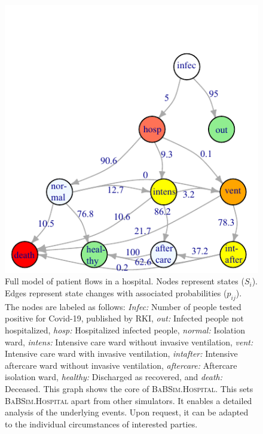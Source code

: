 \documentclass[conference]{IEEEtran}
\newcommand{\babsimhospital}{\textsc{BaBSim.Hospital}\xspace}
\begin{document}
\begin{figure}
    \centering
    \includegraphics[width=\linewidth]{modelgraph.pdf}
    \caption{Full model of patient flows in a hospital. Nodes represent states ($S_i$). Edges represent state changes with associated probabilities ($p_{ij}$). The nodes are labeled as follows: \emph{Infec:}\/ Number of people tested positive for Covid-19, published by RKI, 
\emph{out:}\/ Infected people not hospitalized, \emph{hosp:}\/ Hospitalized infected people, \emph{normal:}\/ Isolation ward, \emph{intens:}\/ Intensive care ward without invasive ventilation, \emph{vent:}\/ Intensive care ward with invasive ventilation, \emph{intafter:}\/ Intensive aftercare ward without invasive ventilation, \emph{aftercare:}\/ Aftercare isolation ward, \emph{healthy:}\/ Discharged as recovered, and \emph{death:}\/ Deceased.
This graph shows the core of \babsimhospital. This sets \babsimhospital apart from other simulators. It enables a detailed analysis of the underlying events. Upon request, it can be adapted to the individual circumstances of interested parties.}
\label{fig:prob}
\end{figure}
\end{document}
